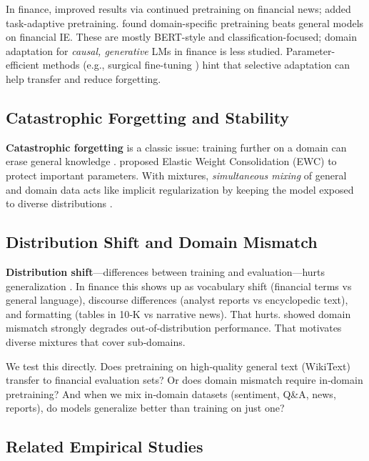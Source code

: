 In finance, \textcite{araci2019finbert} improved results via continued pretraining on financial news; \textcite{yang2020finbert} added task-adaptive pretraining. \textcite{huang2023finbert} found domain-specific pretraining beats general models on financial IE. These are mostly BERT-style and classification-focused; domain adaptation for \textit{causal, generative} LMs in finance is less studied. Parameter-efficient methods (e.g., surgical fine-tuning \parencite{lee2022surgical}) hint that selective adaptation can help transfer and reduce forgetting.

\subsection{Catastrophic Forgetting and Stability}

\textbf{Catastrophic forgetting} is a classic issue: training further on a domain can erase general knowledge \parencite{mccloskey1989catastrophic, french1999catastrophic}. \textcite{kirkpatrick2017overcoming} proposed Elastic Weight Consolidation (EWC) to protect important parameters. With mixtures, \textit{simultaneous mixing} of general and domain data acts like implicit regularization by keeping the model exposed to diverse distributions \parencite{arivazhagan2019massively,raffel2020exploring}.

\subsection{Distribution Shift and Domain Mismatch}

\textbf{Distribution shift}—differences between training and evaluation—hurts generalization \parencite{quinonero2009dataset}. In finance this shows up as vocabulary shift (financial terms vs general language), discourse differences (analyst reports vs encyclopedic text), and formatting (tables in 10‑K vs narrative news). That hurts. \textcite{aharoni2020unsupervised} showed domain mismatch strongly degrades out‑of‑distribution performance. That motivates diverse mixtures that cover sub‑domains.

We test this directly. Does pretraining on high‑quality general text (WikiText) transfer to financial evaluation sets? Or does domain mismatch require in‑domain pretraining? And when we mix in‑domain datasets (sentiment, Q\&A, news, reports), do models generalize better than training on just one?

\subsection{Related Empirical Studies}

